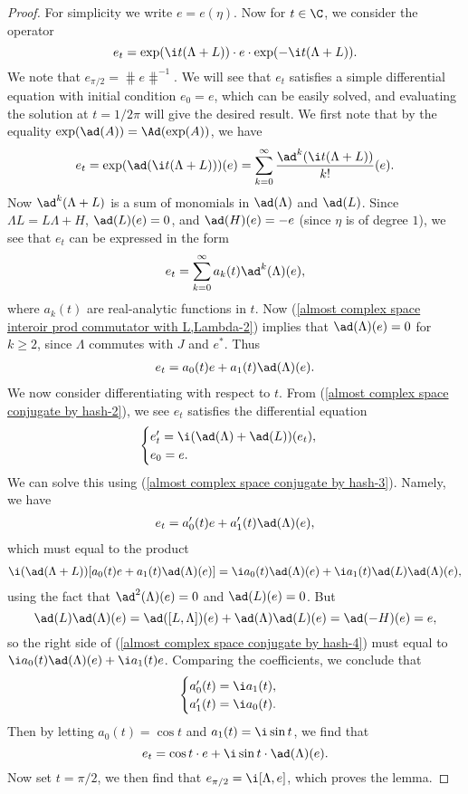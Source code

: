\begin{proof}
For simplicity we write $e=e(\eta)$. Now for $t\in\C$, we consider the operator
\[e_t=\exp(\i t(\Lambda+L))\cdot e\cdot \exp(-\i t(\Lambda+L)).\]
We note that $e_{\pi/2}=\hash e\hash^{-1}$. We will see that $e_t$ satisfies a simple differential equation with initial condition $e_0=e$, which can be easily solved, and evaluating the solution at $t=1/2\pi$ will give the desired result. We first note that by the equality $\exp(\ad(A))=\Ad(\exp(A))$, we have
\begin{align}\label{almost complex space conjugate by hash-2}
e_t=\exp(\ad(\i t(\Lambda+L)))(e)=\sum_{k=0}^{\infty}\frac{\ad^k(\i t(\Lambda+L))}{k!}(e).
\end{align}
Now $\ad^k(\Lambda+L)$ is a sum of monomials in $\ad(\Lambda)$ and $\ad(L)$. Since $\Lambda L=L\Lambda+H$, $\ad(L)(e)=0$, and $\ad(H)(e)=-e$ (since $\eta$ is of degree $1$), we see that $e_t$ can be expressed in the form
\[e_t=\sum_{k=0}^{\infty}a_k(t)\ad^k(\Lambda)(e),\]
where $a_k(t)$ are real-analytic functions in $t$. Now (\ref{almost complex space interoir prod commutator with L,Lambda-2}) implies that $\ad(\Lambda)(e)=0$ for $k\geq 2$, since $\Lambda$ commutes with $J$ and $e^*$. Thus
\begin{align}\label{almost complex space conjugate by hash-3}
e_t=a_0(t)e+a_1(t)\ad(\Lambda)(e).
\end{align}
We now consider differentiating with respect to $t$. From (\ref{almost complex space conjugate by hash-2}), we see $e_t$ satisfies the differential equation
\[\begin{cases}
e'_t=\i(\ad(\Lambda)+\ad(L))(e_t),\\
e_0=e.
\end{cases}\]
We can solve this using (\ref{almost complex space conjugate by hash-3}). Namely, we have
\begin{align}\label{almost complex space conjugate by hash-4}
e_t=a_0'(t)e+a_1'(t)\ad(\Lambda)(e),
\end{align}
which must equal to the product
\begin{align*}
\i(\ad(\Lambda+L))[a_0(t)e+a_1(t)\ad(\Lambda)(e)]=\i a_0(t)\ad(\Lambda)(e)+\i a_1(t)\ad(L)\ad(\Lambda)(e),
\end{align*}
using the fact that $\ad^2(\Lambda)(e)=0$ and $\ad(L)(e)=0$. But
\[\ad(L)\ad(\Lambda)(e)=\ad([L,\Lambda])(e)+\ad(\Lambda)\ad(L)(e)=\ad(-H)(e)=e,\]
so the right side of (\ref{almost complex space conjugate by hash-4}) must equal to $\i a_0(t)\ad(\Lambda)(e)+\i a_1(t)e$. Comparing the coefficients, we conclude that
\[\begin{cases}
a_0'(t)=\i a_1(t),\\
a_1'(t)=\i a_0(t).
\end{cases}\]
Then by letting $a_0(t)=\cos t$ and $a_1(t)=\i\sin t$, we find that
\[e_t=\cos t\cdot e+\i\sin t\cdot\ad(\Lambda)(e).\]
Now set $t=\pi/2$, we then find that $e_{\pi/2}=\i[\Lambda,e]$, which proves the lemma.
\end{proof}
